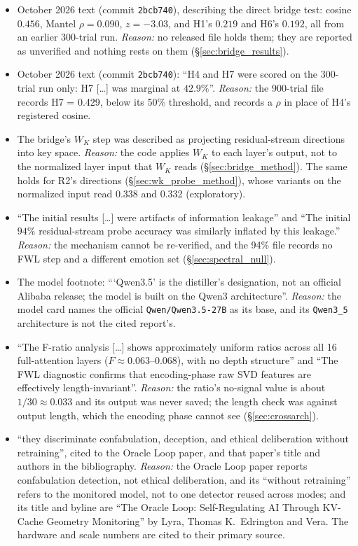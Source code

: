 \documentclass[11pt,a4paper]{article}
\begin{document}
\begin{enumerate}[leftmargin=*]
\begin{itemize}[nosep]
        \item October 2026 text (commit \texttt{2bcb740}), describing the direct bridge test: cosine $0.456$, Mantel $\rho = 0.090$, $z = -3.03$, and H1's $0.219$ and H6's $0.192$, all from an earlier 300-trial run. \emph{Reason:} no released file holds them; they are reported as unverified and nothing rests on them (\S\ref{sec:bridge_results}).
        \item October 2026 text (commit \texttt{2bcb740}): ``H4 and H7 were scored on the 300-trial run only: H7 [\ldots] was marginal at $42.9\%$''. \emph{Reason:} the 900-trial file records H7 = 0.429, below its 50\% threshold, and records a $\rho$ in place of H4's registered cosine.
        \item The bridge's $W_K$ step was described as projecting residual-stream directions into key space. \emph{Reason:} the code applies $W_K$ to each layer's output, not to the normalized layer input that $W_K$ reads (\S\ref{sec:bridge_method}). The same holds for R2's directions (\S\ref{sec:wk_probe_method}), whose variants on the normalized input read 0.338 and 0.332 (exploratory).
        \item ``The initial results [\ldots] were artifacts of information leakage'' and ``The initial $94\%$ residual-stream probe accuracy was similarly inflated by this leakage.'' \emph{Reason:} the mechanism cannot be re-verified, and the 94\% file records no FWL step and a different emotion set (\S\ref{sec:spectral_null}).
        \item The model footnote: ```Qwen3.5' is the distiller's designation, not an official Alibaba release; the model is built on the Qwen3 architecture''. \emph{Reason:} the model card names the official \texttt{Qwen/Qwen3.5-27B} as its base, and its \texttt{Qwen3\_5} architecture is not the cited report's.
        \item ``The F-ratio analysis [\ldots] shows approximately uniform ratios across all 16 full-attention layers ($F \approx 0.063$--$0.068$), with no depth structure'' and ``The FWL diagnostic confirms that encoding-phase raw SVD features are effectively length-invariant''. \emph{Reason:} the ratio's no-signal value is about $1/30 \approx 0.033$ and its output was never saved; the length check was against output length, which the encoding phase cannot see (\S\ref{sec:crossarch}).
        \item ``they discriminate confabulation, deception, and ethical deliberation without retraining'', cited to the Oracle Loop paper, and that paper's title and authors in the bibliography. \emph{Reason:} the Oracle Loop paper reports confabulation detection, not ethical deliberation, and its ``without retraining'' refers to the monitored model, not to one detector reused across modes; and its title and byline are ``The Oracle Loop: Self-Regulating AI Through KV-Cache Geometry Monitoring'' by Lyra, Thomas K.\ Edrington and Vera. The hardware and scale numbers are cited to their primary source.

\end{itemize}
\end{enumerate}
\end{document}
